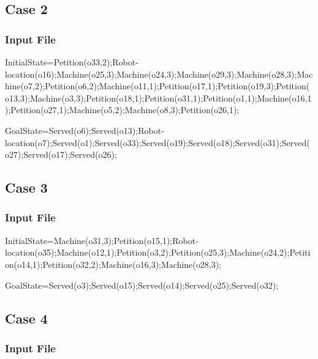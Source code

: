 \documentclass[12pt,a4paper,oneside]{article}
\numberwithin{equation}{section}
\numberwithin{equation}{section}
\theoremstyle{definition}
\begin{document}
 


\subsection*{Case 2}

\subsubsection*{Input File}

\begin{listing}[style=consola, numbers=none]
InitialState=Petition(o33,2);Robot-location(o16);Machine(o25,3);Machine(o24,3);Machine(o29,3);Machine(o28,3);Machine(o7,2);Petition(o6,2);Machine(o11,1);Petition(o17,1);Petition(o19,3);Petition(o13,3);Machine(o3,3);Petition(o18,1);Petition(o31,1);Petition(o1,1);Machine(o16,1);Petition(o27,1);Machine(o5,2);Machine(o8,3);Petition(o26,1);

GoalState=Served(o6);Served(o13);Robot-location(o7);Served(o1);Served(o33);Served(o19);Served(o18);Served(o31);Served(o27);Served(o17);Served(o26);
\end{listing}

 


\subsection*{Case 3}

\subsubsection*{Input File}

\begin{listing}[style=consola, numbers=none]
InitialState=Machine(o31,3);Petition(o15,1);Robot-location(o35);Machine(o12,1);Petition(o3,2);Petition(o25,3);Machine(o24,2);Petition(o14,1);Petition(o32,2);Machine(o16,3);Machine(o28,3);

GoalState=Served(o3);Served(o15);Served(o14);Served(o25);Served(o32);
\end{listing}

 


\subsection*{Case 4}

\subsubsection*{Input File}
\end{document}
